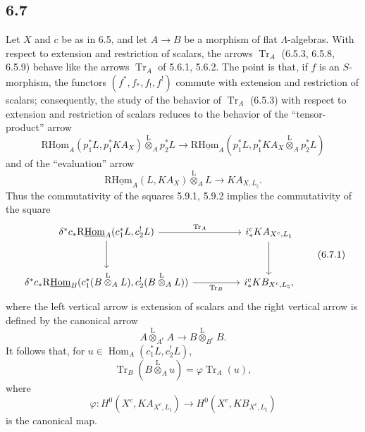 \documentclass[11pt]{article}
\DeclareMathOperator{\Hom}{Hom}
\providecommand{\Tr}{\operatorname{Tr}}
\providecommand{\Tr}{\operatorname{Tr}}
\providecommand{\lten}{\overset{\mathrm L}{\otimes}}
\providecommand{\Tr}{\operatorname{Tr}}
\providecommand{\Hom}{\operatorname{Hom}}
\providecommand{\lten}{\overset{\mathrm L}{\otimes}}
\providecommand{\lten}{\overset{\mathrm L}{\otimes}}
\providecommand{\Tr}{\operatorname{Tr}}
\providecommand{\lten}{\overset{\mathrm L}{\otimes}}
\providecommand{\lten}{\overset{\mathrm L}{\otimes}}
\providecommand{\lten}{\overset{\mathrm L}{\otimes}}
\providecommand{\Hom}{\operatorname{Hom}}
\providecommand{\Tr}{\operatorname{Tr}}
\providecommand{\lten}{\overset{\mathrm L}{\otimes}}
\begin{document}
\subsection*{6.7}
Let $X$ and $c$ be as in 6.5, and let $A\to B$ be a morphism of flat $\Lambda$-algebras. With respect to extension and restriction of scalars, the arrows $\Tr_A$ (6.5.3, 6.5.8, 6.5.9) behave like the arrows $\Tr_A$ of 5.6.1, 5.6.2. The point is that, if $f$ is an $S$-morphism, the functors $(f^*,f_*,f_!,f^!)$ commute with extension and restriction of scalars; consequently, the study of the behavior of $\Tr_A$ (6.5.3) with respect to extension and restriction of scalars reduces to the behavior of the “tensor-product” arrow
\[
\mathrm{R}\underline{\mathrm{Hom}}_A(p_1^*L,p_1^*KA_X)\lten_Ap_2^*L
\longrightarrow
\mathrm{R}\underline{\mathrm{Hom}}_A(p_1^*L,p_1^*KA_X\lten_Ap_2^*L)
\]
and of the “evaluation” arrow
\[
\mathrm{R}\underline{\mathrm{Hom}}_A(L,KA_X)\lten_A L\longrightarrow KA_{X,L_{\natural}}.
\]
Thus the commutativity of the squares 5.9.1, 5.9.2 implies the commutativity of the square
\begin{equation}
\begin{tikzcd}[column sep=huge,row sep=large]
\delta^*c_*\mathrm{R}\underline{\mathrm{Hom}}_A(c_1^*L,c_2^!L) \arrow[r,"\Tr_A"] \arrow[d]
& i_*^cKA_{X^c,L_{\natural}} \arrow[d]\\
\delta^*c_*\mathrm{R}\underline{\mathrm{Hom}}_B(c_1^*(B\lten_A L),c_2^!(B\lten_A L)) \arrow[r,"\Tr_B"']
& i_*^cKB_{X^c,L_{\natural}},
\end{tikzcd}
\tag{6.7.1}
\end{equation}
where the left vertical arrow is extension of scalars and the right vertical arrow is defined by the canonical arrow
\[
A\lten_{A^e}A\longrightarrow B\lten_{B^e}B.
\]
It follows that, for $u\in\Hom_A(c_1^*L,c_2^!L)$,
\begin{equation}
\Tr_B(B\lten_Au)=\varphi\Tr_A(u),
\tag{6.7.2}
\end{equation}
where
\[
\varphi:H^0(X^c,KA_{X^c,L_{\natural}})\longrightarrow H^0(X^c,KB_{X^c,L_{\natural}})
\]
is the canonical map.
\end{document}
